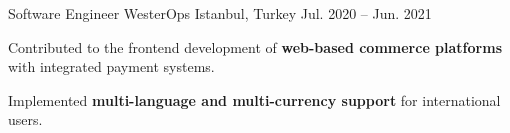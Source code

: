 \begin{cventries}
\cventry
{Software Engineer}
{WesterOps}
{Istanbul, Turkey}
{Jul. 2020 -- Jun. 2021}
{\begin{cvitems}
\item {Contributed to the frontend development of \textbf{web-based commerce platforms} with integrated payment systems.}
\item {Implemented \textbf{multi-language and multi-currency support} for international users.}
\end{cvitems}}

\end{cventries}
